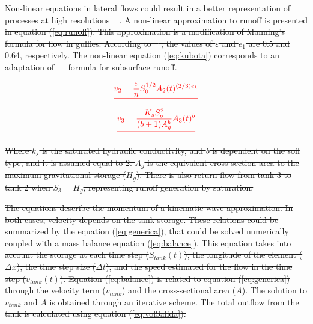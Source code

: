 \documentclass[hess, manuscript]{copernicus} %
\providecommand{\DIFdel}[1]{{\protect\color{red}\sout{#1}}}                      %
\begin{document}
\DIFdel{Non-linear equations in lateral flows could result in a better representation of processes at high resolutions \mbox{%
\citep{Beven1981, Kirkby1967}}\hspace{0pt}%
.  A non-linear approximation to runoff is presented in equation (\ref{eq:runoff}).   This approximation is a modification of Manning's formula for flow in gullies. According to \mbox{%
\citet{Foster1984}}\hspace{0pt}%
, the values of $\varepsilon$ and $e_1$ are 0.5 and 0.64, respectively.  The non-linear equation (\ref{eq:kubota}) corresponds to an adaptation of \mbox{%
\citet{Kubota1995} }\hspace{0pt}%
formula for subsurface runoff. 
}%

\begin{displaymath}
 \DIFdel{v_{2} = \frac{\varepsilon}{n}  S_{0}^{1/2} A_{2}(t)^{(2/3) e_1}
}\end{displaymath}
\begin{displaymath}
 \DIFdel{v_3 = \frac{K_s S_{o}^{2}}{(b+1) A_{g}^{b}} A_{3}(t)^{b}
}\end{displaymath}

\DIFdel{Where $k_s$ is the saturated hydraulic conductivity, and $b$ is dependent on the soil type, and it is assumed equal to 2.  $A_g$ is the equivalent cross-section area to the maximum gravitational storage ($H_g$).  There is also return flow from tank 3 to tank 2 when $S_3=H_g$, representing runoff generation by saturation.   
}%

\DIFdel{The equations describe the momentum of a kinematic wave approximation. In both cases, velocity depends on the tank storage. These relations could be summarized by the equation (\ref{eq:generica}),  that could be solved numerically coupled with a mass balance equation (\ref{eq:balance}). This equation takes into account the storage at each time step ($S_{tank}(t)$), the longitude of the element ($\Delta x$), the time step size ($\Delta t$), and the speed estimated for the flow in the time step ($v_{tank}(t)$).  Equation (\ref{eq:balance}) is related to equation (\ref{eq:generica}) through the velocity term ($v_{tank}$) and the cross-sectional area ($A$).  The solution to $v_{tank}$ and $A$ is obtained through an iterative scheme.  The total outflow from the tank is calculated using equation (\ref{eq:volSalida}).
}%
\end{document}

